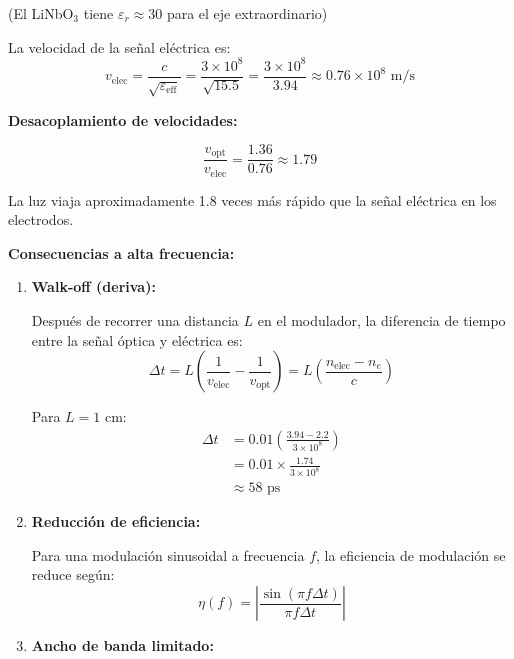 \documentclass[12pt,a4paper]{article}
\begin{document}
\begin{enumerate}
\begin{enumerate}
    (El LiNbO$_3$ tiene $\varepsilon_r \approx 30$ para el eje extraordinario)
    
    La velocidad de la señal eléctrica es:
    \begin{equation}
        v_{\text{elec}} = \frac{c}{\sqrt{\varepsilon_{\text{eff}}}} = \frac{3 \times 10^8}{\sqrt{15.5}} = \frac{3 \times 10^8}{3.94} \approx 0.76 \times 10^8 \text{ m/s}
    \end{equation}
\end{enumerate}

\textbf{Desacoplamiento de velocidades:}

\begin{equation}
    \frac{v_{\text{opt}}}{v_{\text{elec}}} = \frac{1.36}{0.76} \approx 1.79
\end{equation}

La luz viaja aproximadamente 1.8 veces más rápido que la señal eléctrica en los electrodos.

\textbf{Consecuencias a alta frecuencia:}

\begin{enumerate}
    \item \textbf{Walk-off (deriva):}
    
    Después de recorrer una distancia $L$ en el modulador, la diferencia de tiempo entre la señal óptica y eléctrica es:
    \begin{equation}
        \Delta t = L \left(\frac{1}{v_{\text{elec}}} - \frac{1}{v_{\text{opt}}}\right) = L \left(\frac{n_{\text{elec}} - n_e}{c}\right)
    \end{equation}
    
    Para $L = 1$ cm:
    \begin{align}
        \Delta t &= 0.01 \left(\frac{3.94 - 2.2}{3 \times 10^8}\right) \\
        &= 0.01 \times \frac{1.74}{3 \times 10^8} \\
        &\approx 58 \text{ ps}
    \end{align}
    
    \item \textbf{Reducción de eficiencia:}
    
    Para una modulación sinusoidal a frecuencia $f$, la eficiencia de modulación se reduce según:
    \begin{equation}
        \eta(f) = \left|\frac{\sin(\pi f \Delta t)}{\pi f \Delta t}\right|
    \end{equation}
    
    \item \textbf{Ancho de banda limitado:}
    

\end{enumerate}
\end{enumerate}
\end{document}
